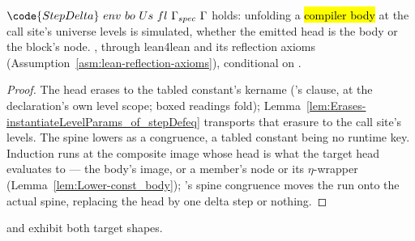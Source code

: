 \begin{theorem}
\label{thm:step_delta}
\leanok
{}
 $\code{StepDelta}\ env\ bo\ Us\ fl\ \Gamma_{spec}\ \Gamma$ holds: unfolding a \hl{compiler
body} at the call site's universe levels is simulated, whether the emitted head is the body or the
block's  node.
 \stProved{}, \stInherited{} through lean4lean and its reflection axioms
(Assumption~\ref{asm:lean-reflection-axioms}), conditional on \stAssumed{} .
\end{theorem}
\begin{proof}
\leanok
{}
 The head erases to the tabled constant's kername (\ErasesEnv{}'s  clause, at the
declaration's own level scope; boxed readings fold); Lemma~\ref{lem:Erases-instantiateLevelParams_of_stepDefeq}
transports that erasure to the call site's levels. The spine lowers as a congruence, a tabled constant
being no runtime key. Induction runs at the composite image whose head is what the target head evaluates
to --- the body's image, or a member's  node or its $\eta$-wrapper
(Lemma~\ref{lem:Lower-const_body}); \lbox{}'s spine congruence moves the run onto the actual spine,
replacing the head by one delta step or nothing.
\end{proof}

\begin{remark}
  and  exhibit both
target shapes.
\end{remark}

